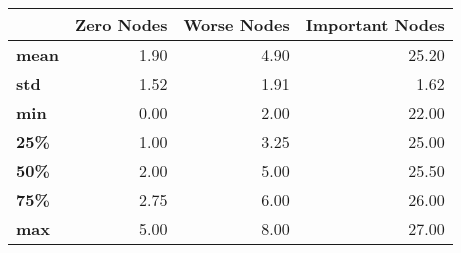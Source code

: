 \begin{tabular}{lrrr}
\toprule
{} &  Zero Nodes &  Worse Nodes &  Important Nodes \\
\midrule
\textbf{mean} &        1.90 &         4.90 &            25.20 \\
\textbf{std } &        1.52 &         1.91 &             1.62 \\
\textbf{min } &        0.00 &         2.00 &            22.00 \\
\textbf{25\% } &        1.00 &         3.25 &            25.00 \\
\textbf{50\% } &        2.00 &         5.00 &            25.50 \\
\textbf{75\% } &        2.75 &         6.00 &            26.00 \\
\textbf{max } &        5.00 &         8.00 &            27.00 \\
\bottomrule
\end{tabular}

